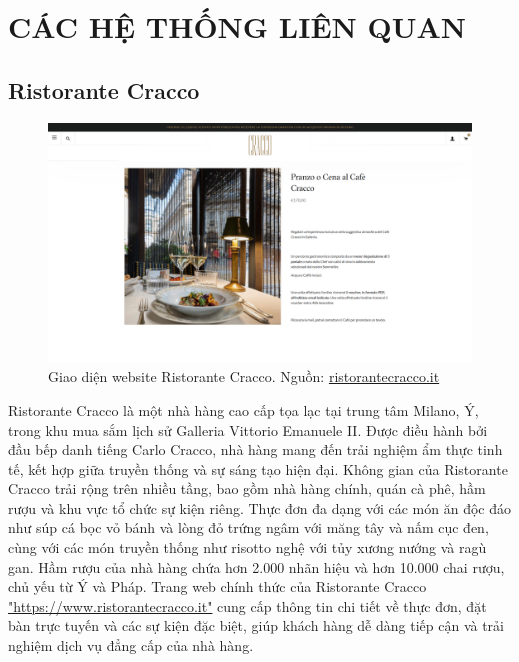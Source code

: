 \section{CÁC HỆ THỐNG LIÊN QUAN}
\subsection{Ristorante Cracco}

\begin{figure}[H]
    \centering
    \includegraphics[width=15cm]{Images/ristorante_cracco.png}
    \vspace{0.5cm}
    \caption{Giao diện website Ristorante Cracco. Nguồn: \href{https://www.ristorantecracco.it}{ristorantecracco.it}}
    \label{fig:my_label}
\end{figure}

Ristorante Cracco là một nhà hàng cao cấp tọa lạc tại trung tâm Milano, Ý, trong khu mua sắm lịch sử Galleria Vittorio Emanuele II. Được điều hành bởi đầu bếp danh tiếng Carlo Cracco, nhà hàng mang đến trải nghiệm ẩm thực tinh tế, kết hợp giữa truyền thống và sự sáng tạo hiện đại. Không gian của Ristorante Cracco trải rộng trên nhiều tầng, bao gồm nhà hàng chính, quán cà phê, hầm rượu và khu vực tổ chức sự kiện riêng. Thực đơn đa dạng với các món ăn độc đáo như súp cá bọc vỏ bánh và lòng đỏ trứng ngâm với măng tây và nấm cục đen, cùng với các món truyền thống như risotto nghệ với tủy xương nướng và ragù gan. Hầm rượu của nhà hàng chứa hơn 2.000 nhãn hiệu và hơn 10.000 chai rượu, chủ yếu từ Ý và Pháp. Trang web chính thức của Ristorante Cracco \href{https://www.ristorantecracco.it}{"https://www.ristorantecracco.it"} cung cấp thông tin chi tiết về thực đơn, đặt bàn trực tuyến và các sự kiện đặc biệt, giúp khách hàng dễ dàng tiếp cận và trải nghiệm dịch vụ đẳng cấp của nhà hàng.

